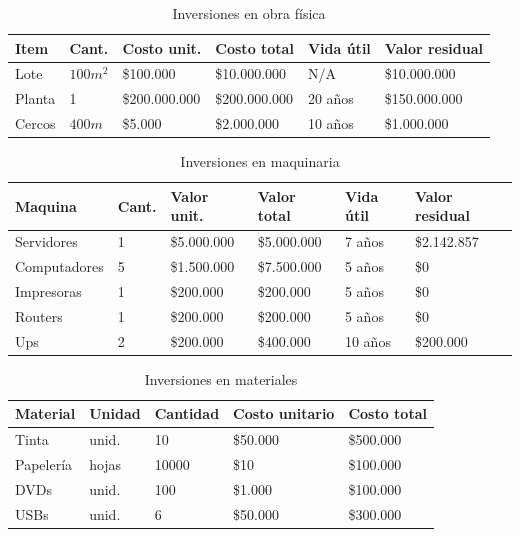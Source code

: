 \documentclass[a4paper, 12pt, oneside]{article}
\begin{document}
	\begin{table}
		\caption{Inversiones en obra física}
		\begin{tabular}{ | p{3cm} | p{1cm} | p{2.5cm} | p{2.5cm} | p{1cm} | p{2.2cm} | }
		\hline
		Item & Cant. & Costo unit. & Costo total & Vida útil & Valor residual \\
		\hline					
		Lote & $100m^2$ & \$100.000 & \$10.000.000 & N/A & \$10.000.000 \\
		\hline					
		Planta & 1 & \$200.000.000 & \$200.000.000 & 20 años & \$150.000.000 \\
		\hline
		Cercos & $400m$ & \$5.000 & \$2.000.000 & 10 años & \$1.000.000 \\
		\hline
		\end{tabular}
		\label{tb:invFisica}
	\end{table}

	\begin{table}
		\caption{Inversiones en maquinaria}
		\begin{tabular}{ | p{3cm} | p{1cm} | p{2.5cm} | p{2.5cm} | p{1cm} | p{2cm} | }
		\hline
		Maquina & Cant. & Valor unit. & Valor total & Vida útil & Valor residual \\
		\hline					
		Servidores & 1 & \$5.000.000 & \$5.000.000 & 7 años & \$2.142.857 \\
		\hline					
		Computadores & 5 & \$1.500.000 & \$7.500.000 & 5 años & \$0 \\
		\hline
		Impresoras & 1 & \$200.000 & \$200.000 & 5 años & \$0 \\ 
		\hline
		Routers & 1 & \$200.000 & \$200.000 & 5 años & \$0 \\
		\hline
		Ups & 2 & \$200.000 & \$400.000 & 10 años & \$200.000 \\
		\hline
		\end{tabular}
		\label{tb:invMaquinaria}
	\end{table}

	\begin{table}
		\caption{Inversiones en materiales}
		\begin{tabular}{ | p{3cm} | p{1.5cm} | p{1.5cm} | p{2cm} | p{2cm} | }
		\hline
		Material & Unidad & Cantidad & Costo unitario & Costo total \\
		\hline
		Tinta & unid. & 10 & \$50.000 & \$500.000 \\ 
		\hline					
		Papelería & hojas & 10000 & \$10 & \$100.000 \\
		\hline
		DVDs & unid. & 100 & \$1.000 & \$100.000 \\
		\hline
		USBs & unid. & 6 & \$50.000 & \$300.000 \\
		\hline
		\end{tabular}
		\label{tb:invMateriales}
	\end{table}
\end{document}
